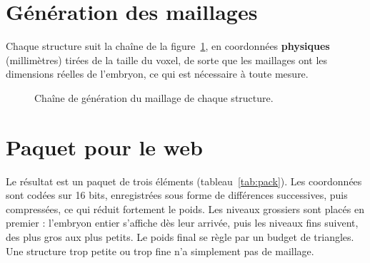\documentclass[12pt,a4paper]{report}
\begin{document}
\section{Génération des maillages}

Chaque structure suit la chaîne de la figure~\ref{fig:meshchain}, en coordonnées \textbf{physiques} (millimètres) tirées de la taille du voxel, de sorte que les maillages ont les dimensions réelles de l'embryon, ce qui est nécessaire à toute mesure.

\begin{figure}[H]
\centering
{}
\caption{Chaîne de génération du maillage de chaque structure.}
\label{fig:meshchain}
\end{figure}

\section{Paquet pour le web}

Le résultat est un paquet de trois éléments (tableau~\ref{tab:pack}). Les coordonnées sont codées sur 16 bits, enregistrées sous forme de différences successives, puis compressées, ce qui réduit fortement le poids. Les niveaux grossiers sont placés en premier : l'embryon entier s'affiche dès leur arrivée, puis les niveaux fins suivent, des plus gros aux plus petits. Le poids final se règle par un budget de triangles. Une structure trop petite ou trop fine n'a simplement pas de maillage.
\end{document}
